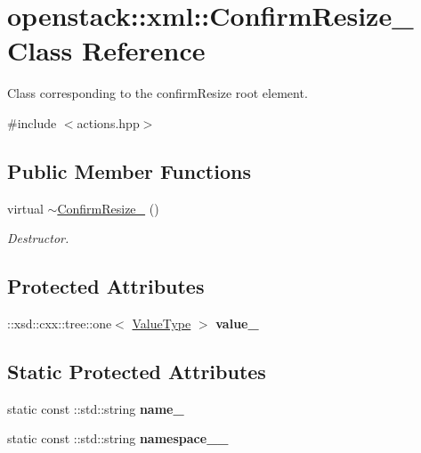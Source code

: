 \hypertarget{classopenstack_1_1xml_1_1ConfirmResize__}{
\section{openstack::xml::ConfirmResize\_\- Class Reference}
\label{classopenstack_1_1xml_1_1ConfirmResize__}
}


Class corresponding to the confirmResize root element.  




{\ttfamily \#include $<$actions.hpp$>$}

\subsection*{Public Member Functions}
\begin{DoxyCompactItemize}
\item 
\hypertarget{classopenstack_1_1xml_1_1ConfirmResize___a97dce24433857a98b08e206ed571cc4e}{
virtual \hyperlink{classopenstack_1_1xml_1_1ConfirmResize___a97dce24433857a98b08e206ed571cc4e}{$\sim$ConfirmResize\_\-} ()}
\label{classopenstack_1_1xml_1_1ConfirmResize___a97dce24433857a98b08e206ed571cc4e}

\begin{DoxyCompactList}\small\item\em Destructor. \item\end{DoxyCompactList}\end{DoxyCompactItemize}
\subsection*{Protected Attributes}
\begin{DoxyCompactItemize}
\item 
\hypertarget{classopenstack_1_1xml_1_1ConfirmResize___a486103fb06f8966b780e97c5444092e3}{
::xsd::cxx::tree::one$<$ \hyperlink{classopenstack_1_1xml_1_1ConfirmResize}{ValueType} $>$ {\bfseries value\_\-}}
\label{classopenstack_1_1xml_1_1ConfirmResize___a486103fb06f8966b780e97c5444092e3}

\end{DoxyCompactItemize}
\subsection*{Static Protected Attributes}
\begin{DoxyCompactItemize}
\item 
\hypertarget{classopenstack_1_1xml_1_1ConfirmResize___a541cf56e067cd20237e8d5a1e5bf00eb}{
static const ::std::string {\bfseries name\_\-}}
\label{classopenstack_1_1xml_1_1ConfirmResize___a541cf56e067cd20237e8d5a1e5bf00eb}

\item 
\hypertarget{classopenstack_1_1xml_1_1ConfirmResize___a2012a0429c2f4737eba49e18a3859044}{
static const ::std::string {\bfseries namespace\_\-\_\-}}
\label{classopenstack_1_1xml_1_1ConfirmResize___a2012a0429c2f4737eba49e18a3859044}

\end{DoxyCompactItemize}
